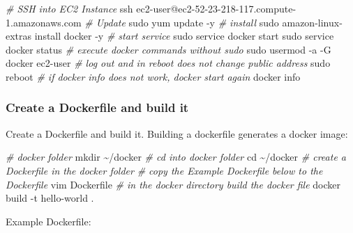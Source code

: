 \documentclass[
]{book}
\newenvironment{Shaded}{\begin{snugshade}}{\end{snugshade}}
\newcommand{\BuiltInTok}[1]{#1}
\newcommand{\CommentTok}[1]{\textcolor[rgb]{0.56,0.35,0.01}{\textit{#1}}}
\newcommand{\ExtensionTok}[1]{#1}
\newcommand{\FunctionTok}[1]{\textcolor[rgb]{0.00,0.00,0.00}{#1}}
\newcommand{\NormalTok}[1]{#1}
\begin{document}
\begin{Shaded}
\begin{Highlighting}[]
\CommentTok{\# SSH into EC2 Instance}
\FunctionTok{ssh}\NormalTok{ ec2{-}user@ec2{-}52{-}23{-}218{-}117.compute{-}1.amazonaws.com}
\CommentTok{\# Update}
\FunctionTok{sudo}\NormalTok{ yum update {-}y}
\CommentTok{\# install}
\FunctionTok{sudo}\NormalTok{ amazon{-}linux{-}extras install docker {-}y}
\CommentTok{\# start service}
\FunctionTok{sudo}\NormalTok{ service docker start}
\FunctionTok{sudo}\NormalTok{ service docker status}
\CommentTok{\# execute docker commands without sudo}
\FunctionTok{sudo}\NormalTok{ usermod {-}a {-}G docker ec2{-}user}
\CommentTok{\# log out and in reboot does not change public address}
\FunctionTok{sudo}\NormalTok{ reboot}
\CommentTok{\# if docker info does not work, docker start again}
\ExtensionTok{docker}\NormalTok{ info}
\end{Highlighting}
\end{Shaded}

\hypertarget{create-a-dockerfile-and-build-it}{%
\subsubsection{Create a Dockerfile and build it}\label{create-a-dockerfile-and-build-it}}

Create a Dockerfile and build it. Building a dockerfile generates a docker image:

\begin{Shaded}
\begin{Highlighting}[]
\CommentTok{\# docker folder}
\FunctionTok{mkdir}\NormalTok{ \textasciitilde{}/docker}
\CommentTok{\# cd into docker folder}
\BuiltInTok{cd}\NormalTok{ \textasciitilde{}/docker}
\CommentTok{\# create a Dockerfile in the docker folder}
\CommentTok{\# copy the Example Dockerfile below to the Dockerfile}
\ExtensionTok{vim}\NormalTok{ Dockerfile}
\CommentTok{\# in the docker directory build the docker file}
\ExtensionTok{docker}\NormalTok{ build {-}t hello{-}world .}
\end{Highlighting}
\end{Shaded}

Example Dockerfile:
\end{document}
